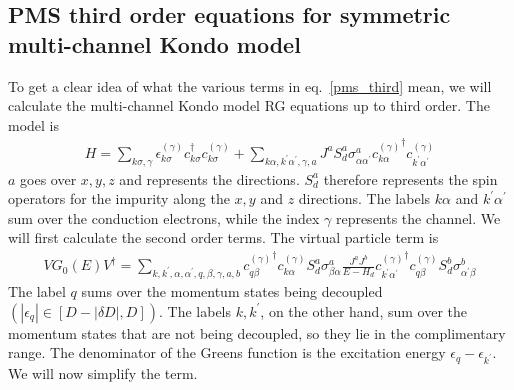 \subsection{PMS third order equations for symmetric multi-channel Kondo model}
To get a clear idea of what the various terms in eq.~\ref{pms_third} mean, we will calculate the multi-channel Kondo model RG equations up to third order. The model is
\begin{equation}\begin{aligned}
	H = \sum_{k\sigma,\gamma}\epsilon_{k\sigma}^{(\gamma)}c^\dagger_{k\sigma}c^{(\gamma)}_{k\sigma} + \sum_{k\alpha,k^\prime \alpha^\prime,\gamma,a}J^a S_d^a \sigma^a_{\alpha\alpha^\prime}{c^{(\gamma)}_{k\alpha}}^\dagger c^{(\gamma)}_{k^\prime\alpha^\prime}
\end{aligned}\end{equation}
\(a\) goes over \(x,y,z\) and represents the directions. \(S_d^a\) therefore represents the spin operators for the impurity along the \(x,y\) and \(z\) directions. The labels \(k\alpha\) and \(k^\prime\alpha^\prime\) sum over the conduction electrons, while the index \(\gamma\) represents the channel. We will first calculate the second order terms. The virtual particle term is
\begin{equation}\begin{aligned}
	V G_0(E) V^\dagger = \sum_{k,k^\prime,\alpha,\alpha^\prime,q,\beta,\gamma,a,b}{c^{(\gamma)}_{q\beta}}^\dagger {c^{(\gamma)}_{k\alpha}} S_d^a \sigma^a_{\beta\alpha} \frac{J^a J^b}{E - H_d} {c^{(\gamma)}_{k^\prime\alpha^\prime}}^\dagger {c^{(\gamma)}_{q\beta}}S_d^b \sigma^b_{\alpha^\prime\beta}
\end{aligned}\end{equation}
The label \(q\) sums over the momentum states being decoupled \(\left( |\epsilon_q| \in \left[D-|\delta D|, D\right]  \right) \). The labels \(k,k^\prime\), on the other hand, sum over the momentum states that are not being decoupled, so they lie in the complimentary range. The denominator of the Greens function is the excitation energy \(\epsilon_q - \epsilon_{k^\prime}\). We will now simplify the term.
